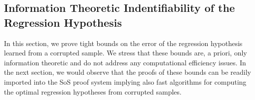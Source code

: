 \subsection{Information Theoretic Indentifiability of the Regression Hypothesis}
In this section, we prove tight bounds on the error of the regression hypothesis learned from a corrupted sample. We stress that these bounds are, a priori, only information theoretic and do not address any computational efficiency issues. In the next section, we would observe that the proofs of these bounds can be readily imported into the SoS proof system implying also fast algorithms for computing the optimal regression hypotheses from corrupted samples. 








